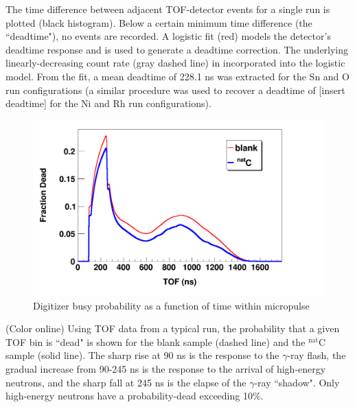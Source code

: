 The time difference between adjacent TOF-detector
    events for a single run is plotted (black histogram). Below a certain
minimum time difference (the ``deadtime"), no events are recorded. A logistic
fit (red) models the detector's deadtime response and is used to generate a
deadtime correction. The underlying linearly-decreasing count rate (gray dashed
line) in incorporated into the logistic model. From the fit, a mean deadtime of
228.1 ns was extracted for the Sn and O run configurations (a similar
procedure was used to recover a deadtime of [insert deadtime] for the Ni and Rh
run configurations).

\begin{figure}
    \includegraphics[scale=0.3]{figures/exampleDeadtimeSpectrum.png}
    \caption{Digitizer busy probability as a function of time within micropulse}
    \label{ExampleDeadtimeSpectrum}
\end{figure}

(Color online) Using TOF data from a typical run, the probability that a given 
        TOF bin is ``dead" is shown for the blank sample (dashed line) and the $^{\text{nat}}$C   
        sample (solid line). The sharp rise at 90 ns is the response to the
        $\gamma$-ray flash, the gradual increase from 90-245 ns is the response to
        the arrival of high-energy neutrons, and the sharp fall at 245 ns
        is the elapse of the $\gamma$-ray ``shadow". Only high-energy neutrons
        have a probability-dead exceeding 10\%.

